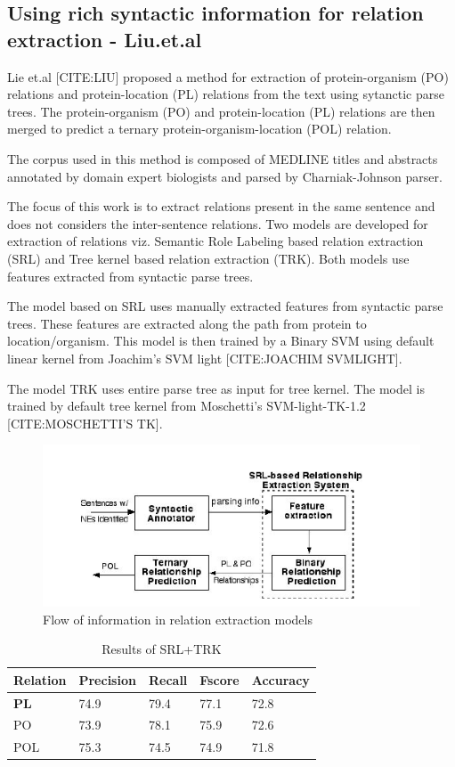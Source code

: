 \subsection*{Using rich syntactic information for relation extraction - Liu.et.al}

Lie et.al [CITE:LIU] proposed a method for extraction of protein-organism (PO) relations and protein-location (PL) relations from the text using sytanctic parse trees. The protein-organism (PO) and protein-location (PL) relations are then merged to predict a ternary protein-organism-location (POL) relation.

The corpus used in this method is composed of MEDLINE titles and abstracts annotated by domain expert biologists and parsed by Charniak-Johnson parser.

The focus of this work is to extract relations present in the same sentence and does not considers the inter-sentence relations. Two models are developed for extraction of relations viz. Semantic Role Labeling based relation extraction (SRL) and Tree kernel based relation extraction (TRK). Both models use features extracted from syntactic parse trees.

The model based on SRL uses manually extracted features from syntactic parse trees. These features are extracted along the path from protein to location/organism. This model is then trained by a Binary SVM using default linear kernel from Joachim’s SVM light [CITE:JOACHIM SVMLIGHT].

The model TRK uses entire parse tree as input for tree kernel. The model is trained by default tree kernel from Moschetti’s SVM-light-TK-1.2 [CITE:MOSCHETTI'S TK].

\begin{figure}[hbtp]
\includegraphics[scale=1]{Liu_Flow.png}
\caption{Flow of information in relation extraction models }
\end{figure}


\begin{table}[h]
\centering
\begin{tabular}{|l|l|l|l|l|}
\hline
\textbf{Relation} & \textbf{Precision} & \textbf{Recall} & \textbf{Fscore} & \textbf{Accuracy} \\ \hline
\textbf{PL} & 74.9 & 79.4 & 77.1 & 72.8 \\
PO & 73.9 & 78.1 & 75.9 & 72.6 \\
POL & 75.3 & 74.5 & 74.9 &  71.8\\ \hline
\end{tabular}
\caption{Results of SRL+TRK}\label{tab:Liu}
\end{table}

